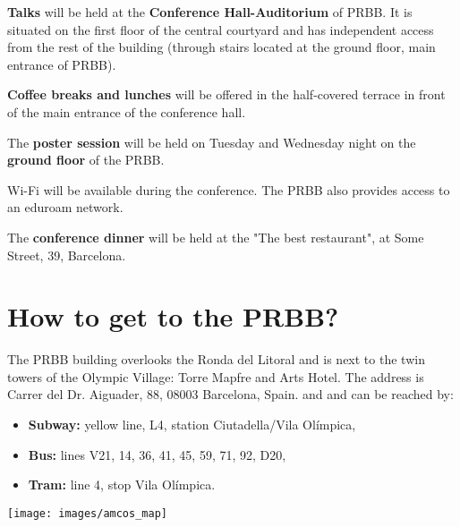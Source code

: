 \textbf{Talks} will be held at the \textbf{Conference Hall-Auditorium} of PRBB. It is situated on the first floor of the central courtyard and
has independent access from the rest of the building (through stairs located at the ground floor, main entrance of PRBB). 

\textbf{Coffee breaks and lunches} will be offered in the half-covered terrace in front of the main entrance of the conference hall.

The \textbf{poster session} will be held on Tuesday and Wednesday night on the \textbf{ground floor} of the PRBB. 

Wi-Fi will be available during the conference. The PRBB also provides access to an eduroam network.

The \textbf{conference dinner} will be held at the "The best restaurant", at Some Street, 39, Barcelona.

\section{How to get to the PRBB?}

The PRBB building overlooks the Ronda del Litoral and is next to the twin towers of the Olympic Village: Torre Mapfre and Arts Hotel. The address is Carrer del Dr. Aiguader, 88, 08003 Barcelona, Spain. and and can be reached by:

\begin{itemize}

	\item \textbf{Subway:} yellow line, L4, station Ciutadella/Vila Ol\'{i}mpica,
	\item \textbf{Bus:} lines V21, 14, 36, 41, 45, 59, 71, 92, D20,
	\item \textbf{Tram:} line 4, stop Vila Ol\'{i}mpica.
	
\end{itemize}

\begin{center}
\texttt{[image: images/amcos\_map]}
\end{center}
